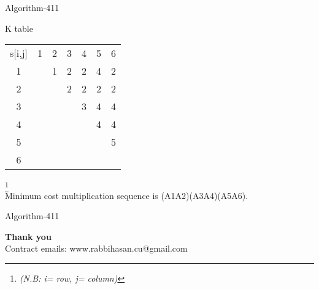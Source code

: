 \documentclass{beamer}
\begin{document}
\begin{frame}[t]{Algorithm-411}
\vspace{15 pt}
  
\begin{block}
{K table } 
 
\begin{tabular}{ccccccc}
s[i,j] & 1& 2 &3 &4 &5 &6 \\
1 &  & 1 &2 &2 &4 &2 \\
2 &  &  &2 &2 &2 &2 \\
3 &  &  &  &3 &4 &4 \\
4 &  &  &   &  &4 &4 \\
5 &  &  &   &   &   &5 \\
6 &  &  &   &   &    & \\

\end{tabular}

\end{block}
\footnote{ \textit{(N.B: i= row, j= column)}}\\
Minimum cost multiplication sequence is (A1A2)(A3A4)(A5A6).

 
 
\end{frame}
\begin{frame}{Algorithm-411}
\begin{center}
\textbf{Thank you}  \\
Contract emails: www.rabbihasan.cu@gmail.com
\end{center}
\end{frame}
 
\end{document}
